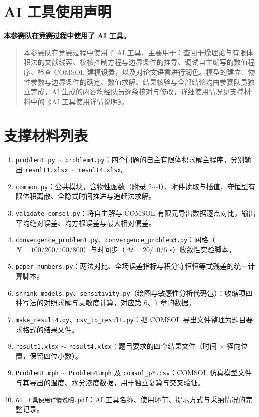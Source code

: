 \documentclass[12pt,a4paper]{article}
\begin{document}
\section*{AI 工具使用声明}

\noindent\textbf{本参赛队在竞赛过程中使用了 AI 工具。}

\begin{quote}
本参赛队在竞赛过程中使用了 AI 工具，主要用于：查阅干燥理论与有限体积法的文献线索、校核控制方程与边界条件的推导、调试自主编写的数值程序、检查 COMSOL 建模设置，以及对论文语言进行润色。模型的建立、物性参数与边界条件的确定、数值求解、结果核验与全部结论均由参赛队员独立完成，AI 生成的内容均经队员逐条核对与修改，详细使用情况见支撑材料中的《AI 工具使用详情说明》。
\end{quote}
\clearpage
\appendix

\section{支撑材料列表}

\begin{enumerate}[label=(\arabic*)]
  \item \texttt{problem1.py} $\sim$ \texttt{problem4.py}：四个问题的自主有限体积求解主程序，分别输出 \texttt{result1.xlsx} $\sim$ \texttt{result4.xlsx}。
  \item \texttt{common.py}：公共模块，含物性函数（附录 2$\sim$4）、附件读取与插值、守恒型有限体积离散、全隐式时间推进与追赶法求解。
  \item \texttt{validate\_comsol.py}：将自主解与 COMSOL 有限元导出数据逐点对比，输出平均绝对误差、均方根误差与最大相对偏差。
  \item \texttt{convergence\_problem1.py}、\texttt{convergence\_problem3.py}：网格（$N=100/200/400/800$）与时间步（$\Delta t=20/10/5$ s）收敛性实验脚本。
  \item \texttt{paper\_numbers.py}：两法对比、全场误差指标与积分守恒恒等式残差的统一计算脚本。
  \item \texttt{shrink\_models.py}、\texttt{sensitivity.py}（绘图与敏感性分析代码包）：收缩项四种写法的对照求解与灵敏度计算，对应第 6、7 章的数据。
  \item \texttt{make\_result4.py}、\texttt{csv\_to\_result.py}：把 COMSOL 导出文件整理为题目要求格式的结果文件。
  \item \texttt{result1.xlsx} $\sim$ \texttt{result4.xlsx}：题目要求的四个结果文件（时间 $\times$ 径向位置，保留四位小数）。
  \item \texttt{Problem1.mph} $\sim$ \texttt{Problem4.mph} 及 \texttt{comsol\_p*.csv}：COMSOL 仿真模型文件与其导出的温度、水分浓度数据，用于独立复算与交叉验证。
  \item \texttt{AI 工具使用详情说明.pdf}：AI 工具名称、使用环节、提示方式与采纳情况的完整记录。
\end{enumerate}
\end{document}
